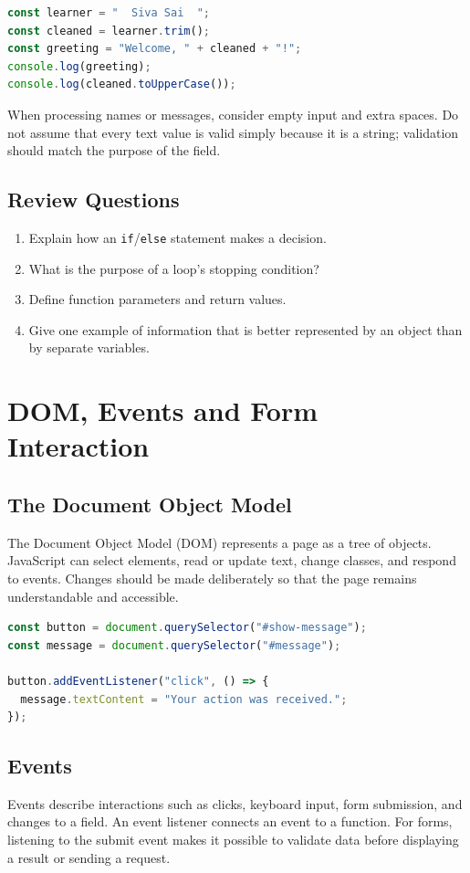 \documentclass[11pt,openany,oneside]{book}
\begin{document}
\begin{lstlisting}[style=webcode,language=JavaScript]
const learner = "  Siva Sai  ";
const cleaned = learner.trim();
const greeting = "Welcome, " + cleaned + "!";
console.log(greeting);
console.log(cleaned.toUpperCase());
\end{lstlisting}
When processing names or messages, consider empty input and extra spaces. Do not assume that every text value is valid simply because it is a string; validation should match the purpose of the field.

\section*{Review Questions}
\begin{enumerate}
\item Explain how an \texttt{if}/\texttt{else} statement makes a decision.
\item What is the purpose of a loop's stopping condition?
\item Define function parameters and return values.
\item Give one example of information that is better represented by an object than by separate variables.
\end{enumerate}

\chapter{DOM, Events and Form Interaction}
\section{The Document Object Model}
The Document Object Model (DOM) represents a page as a tree of objects. JavaScript can select elements, read or update text, change classes, and respond to events. Changes should be made deliberately so that the page remains understandable and accessible.

\begin{lstlisting}[style=webcode,language=JavaScript]
const button = document.querySelector("#show-message");
const message = document.querySelector("#message");

button.addEventListener("click", () => {
  message.textContent = "Your action was received.";
});
\end{lstlisting}

\section{Events}
Events describe interactions such as clicks, keyboard input, form submission, and changes to a field. An event listener connects an event to a function. For forms, listening to the submit event makes it possible to validate data before displaying a result or sending a request.
\end{document}

